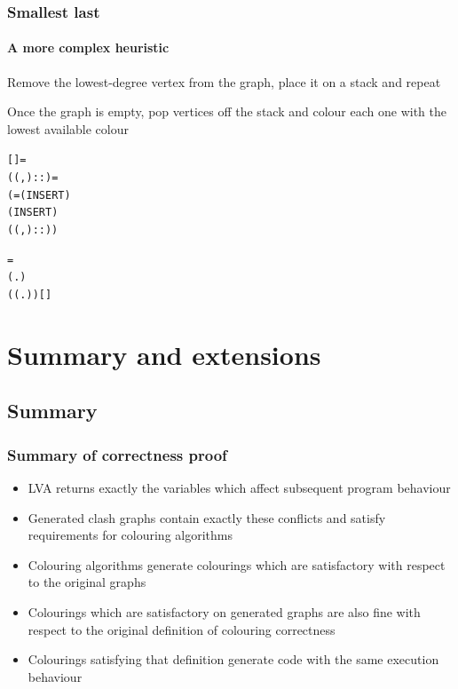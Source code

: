 \documentclass{beamer}
\begin{document}
\begin{frame}[containsverbatim]
\frametitle{Smallest last}
\framesubtitle{A more complex heuristic}
Remove the lowest-degree vertex from the graph, place it on a stack and repeat

Once the graph is empty, pop vertices off the stack and colour each one with the lowest available colour

\begin{alltt}\small
	   =  
  ((,)::)  =
(  =  ( INSERT ) 
    ( INSERT ) 
     ((,)::))
\end{alltt}

\begin{alltt}\small
	  =
 (\HOLTokenLambda{}. )
  ( (\HOLTokenLambda{}. ) ) []
\end{alltt}

\begin{alltt}\small
	\HOLTokenTurnstile{}  
\end{alltt}
\end{frame}

\section{Summary and extensions}
\subsection{Summary}
\begin{frame}
\frametitle{Summary of correctness proof}
\begin{itemize}
	\item LVA returns exactly the variables which affect subsequent program behaviour
	\item Generated clash graphs contain exactly these conflicts and satisfy requirements for colouring algorithms
	\item Colouring algorithms generate colourings which are satisfactory with respect to the original graphs
	\item Colourings which are satisfactory on generated graphs are also fine with respect to the original definition of colouring correctness
	\item Colourings satisfying that definition generate code with the same execution behaviour
\end{itemize}
\end{frame}
\end{document}
